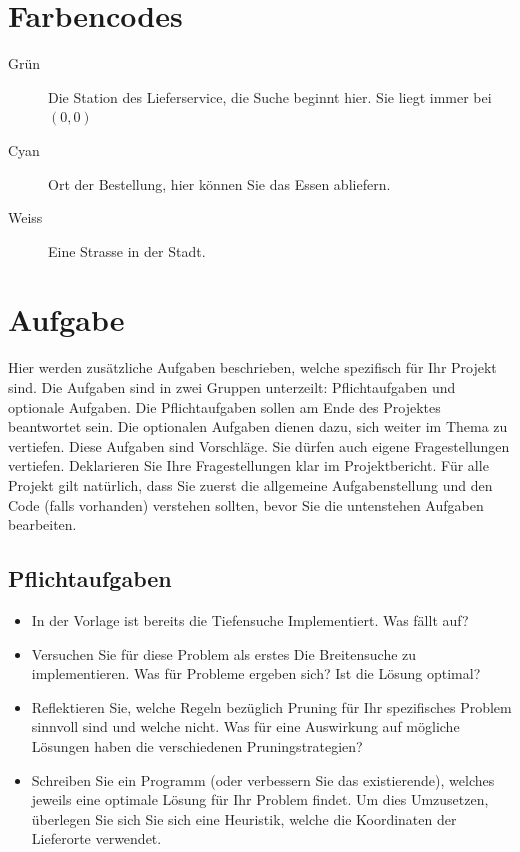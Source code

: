 \documentclass[a4paper,11pt,german,notitlepage]{report}
\begin{document}
\section*{Farbencodes}
\begin{description}
    \item[Grün] Die Station des Lieferservice, die Suche beginnt hier. Sie liegt immer bei $(0,0)$
    \item[Cyan] Ort der Bestellung, hier können Sie das Essen abliefern. 
    \item[Weiss] Eine Strasse in der Stadt.
\end{description}


\section*{Aufgabe}
Hier werden zusätzliche Aufgaben beschrieben, welche spezifisch für Ihr Projekt sind.
Die Aufgaben sind in zwei Gruppen unterzeilt: Pflichtaufgaben und optionale Aufgaben.
Die Pflichtaufgaben sollen am Ende des Projektes beantwortet sein.
Die optionalen Aufgaben dienen dazu, sich weiter im Thema zu vertiefen.
Diese Aufgaben sind Vorschläge. Sie dürfen auch eigene Fragestellungen vertiefen.
Deklarieren Sie Ihre Fragestellungen klar im Projektbericht.
Für alle Projekt gilt natürlich, dass Sie zuerst die allgemeine Aufgabenstellung und den Code (falls vorhanden) verstehen sollten, bevor Sie die untenstehen Aufgaben bearbeiten.
\subsection*{Pflichtaufgaben}
\begin{itemize}
    \item In der Vorlage ist bereits die Tiefensuche Implementiert. Was fällt auf?
    \item Versuchen Sie für diese Problem als erstes Die Breitensuche zu implementieren. Was für Probleme ergeben sich? Ist die Lösung optimal?
    \item Reflektieren Sie, welche Regeln bezüglich Pruning für Ihr spezifisches Problem sinnvoll sind und welche nicht. Was für eine Auswirkung auf mögliche Lösungen haben die verschiedenen Pruningstrategien?
    \item Schreiben Sie ein Programm (oder verbessern Sie das existierende), welches jeweils eine optimale Lösung für Ihr Problem findet. Um dies Umzusetzen, überlegen Sie sich Sie sich eine Heuristik, welche die Koordinaten der Lieferorte verwendet.
\end{itemize}
\end{document}
